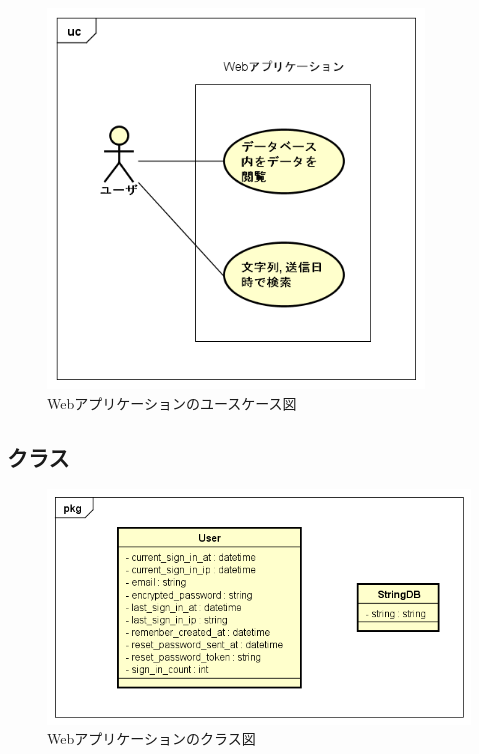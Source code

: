 \begin{figure}
\begin{center}
\includegraphics[width=10cm]{fig/usecase_web.png}
\end{center}
\caption{Webアプリケーションのユースケース図}
\end{figure}

\subsection{クラス}

\begin{figure}
\begin{center}
\includegraphics[width=13cm]{fig/class_web.png}
\end{center}
\caption{Webアプリケーションのクラス図}
\end{figure}

